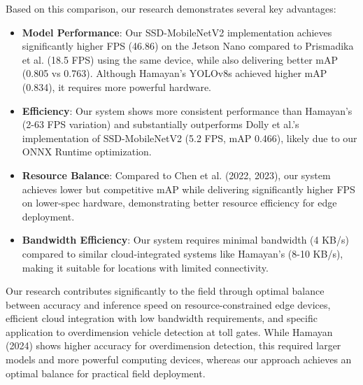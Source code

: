 Based on this comparison, our research demonstrates several key advantages:

\begin{itemize}
    \item \textbf{Model Performance}: Our SSD-MobileNetV2 implementation achieves significantly higher FPS (46.86) on the Jetson Nano compared to Prismadika et al. (18.5 FPS) using the same device, while also delivering better mAP (0.805 vs 0.763). Although Hamayan's YOLOv8s achieved higher mAP (0.834), it requires more powerful hardware.
    
    \item \textbf{Efficiency}: Our system shows more consistent performance than Hamayan's (2-63 FPS variation) and substantially outperforms Dolly et al.'s implementation of SSD-MobileNetV2 (5.2 FPS, mAP 0.466), likely due to our ONNX Runtime optimization.
    
    \item \textbf{Resource Balance}: Compared to Chen et al. (2022, 2023), our system achieves lower but competitive mAP while delivering significantly higher FPS on lower-spec hardware, demonstrating better resource efficiency for edge deployment.
    
    \item \textbf{Bandwidth Efficiency}: Our system requires minimal bandwidth (4 KB/s) compared to similar cloud-integrated systems like Hamayan's (8-10 KB/s), making it suitable for locations with limited connectivity.
\end{itemize}

Our research contributes significantly to the field through optimal balance between accuracy and inference speed on resource-constrained edge devices, efficient cloud integration with low bandwidth requirements, and specific application to overdimension vehicle detection at toll gates. While Hamayan (2024) shows higher accuracy for overdimension detection, this required larger models and more powerful computing devices, whereas our approach achieves an optimal balance for practical field deployment.